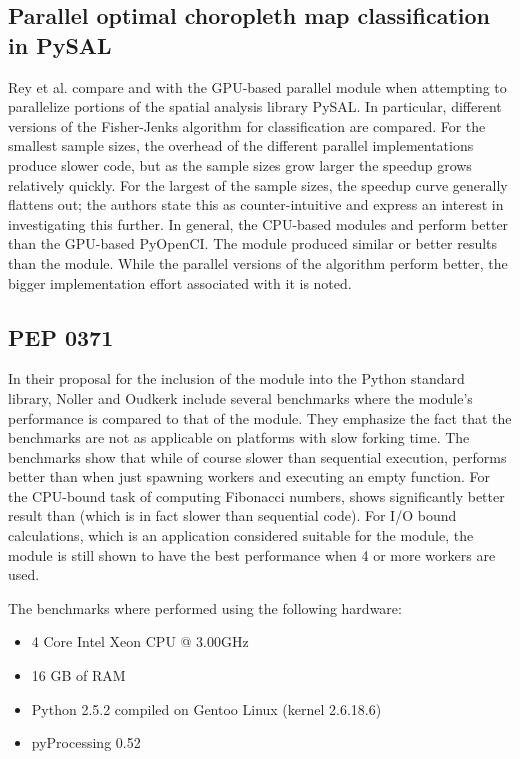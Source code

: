 \subsection{Parallel optimal choropleth map classification in PySAL}
Rey et al. \cite{rey_2013_parallel_pocmcip} compare  and  with the GPU-based parallel
module  when attempting to parallelize portions of the spatial analysis library PySAL. In particular, different
versions of the Fisher-Jenks algorithm for classification are compared. For the smallest sample sizes, the overhead of the
different parallel implementations produce slower code, but as the sample sizes grow larger the speedup grows relatively quickly.
For the largest of the sample sizes, the speedup curve generally flattens out; the authors state this as counter-intuitive and
express an interest in investigating this further. In general, the CPU-based modules  and 
perform better than the GPU-based PyOpenCI. The  module produced similar or better results than the
 module.
While the parallel versions of the algorithm perform better, the bigger implementation effort associated with it is noted.

\subsection{PEP 0371}
In their proposal for the inclusion of the  module into the Python standard library,
Noller and Oudkerk \cite{noller_pep_p0} include several benchmarks where the  module's performance is
compared to
that of the  module. They emphasize the fact that the benchmarks are not as applicable on platforms with slow forking
time. The benchmarks show that while of course slower than sequential execution,  performs better than
 when just spawning workers and executing an empty function. For the CPU-bound task of computing Fibonacci numbers,
 shows significantly better result than  (which is in fact slower than sequential code). For I/O bound
calculations, which is an application considered suitable for the  module, the  module is still shown to have
the best performance when 4 or more workers are used.

The benchmarks where performed using the following hardware:
\begin{itemize}
  \item 4 Core Intel Xeon CPU @ 3.00GHz
  \item 16 GB of RAM
  \item Python 2.5.2 compiled on Gentoo Linux (kernel 2.6.18.6)
  \item pyProcessing 0.52
\end{itemize}

